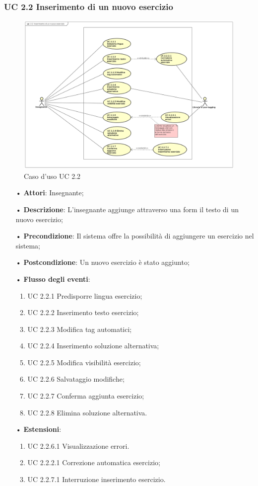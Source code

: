 \subsubsection{UC 2.2 Inserimento di un nuovo esercizio}

\begin{figure}[H]
	\centering
	\includegraphics[width=18cm]{img/UC22.png} 
	\caption{Caso d'uso UC 2.2}
\end{figure}

\begin{itemize}
	\item[•] \textbf{Attori}: Insegnante;
	\item[•] \textbf{Descrizione}: L'insegnante aggiunge attraverso una form il testo di un nuovo esercizio;
	\item[•] \textbf{Precondizione}: Il sistema offre la possibilità di aggiungere un esercizio nel sistema;
	\item[•] \textbf{Postcondizione}: Un nuovo esercizio è stato aggiunto;
	\item[•] \textbf{Flusso degli eventi}:
	\begin{enumerate}
		\item UC 2.2.1 Predisporre lingua esercizio;
		\item UC 2.2.2 Inserimento testo esercizio;
		\item UC 2.2.3 Modifica {tag} automatici;
		\item UC 2.2.4 Inserimento soluzione alternativa;
		\item UC 2.2.5 Modifica visibilità esercizio;
		\item UC 2.2.6 Salvataggio modifiche;
		\item UC 2.2.7 Conferma aggiunta esercizio;
		\item UC 2.2.8 Elimina soluzione alternativa.
	\end{enumerate}
	\item[•] \textbf{Estensioni}:	
	\begin{enumerate}
		\item UC 2.2.6.1 Visualizzazione errori.
		\item UC 2.2.2.1 Correzione automatica esercizio;
		\item UC 2.2.7.1 Interruzione inserimento esercizio.
	\end{enumerate}
\end{itemize}
